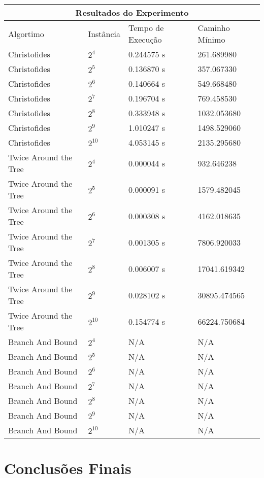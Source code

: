 \documentclass{article}
\begin{document}
\begin{tabular}{ |p{5cm}||p{2cm}|p{3cm}|p{3cm}|}
 \hline
 \multicolumn{4}{|c|}{Resultados do Experimento} \\
 \hline
 Algortimo & Instância & Tempo de Execução & Caminho Mínimo\\
 \hline
 Christofides & $2^4$ & 0.244575 s & 261.689980\\
 Christofides & $2^5$ & 0.136870 s & 357.067330 \\
 Christofides & $2^6$ & 0.140664 s & 549.668480\\
 Christofides & $2^7$ & 0.196704 s & 769.458530\\
 Christofides & $2^8$ & 0.333948 s & 1032.053680\\
 Christofides & $2^9$ & 1.010247 s & 1498.529060\\
 Christofides & $2^10$& 4.053145 s & 2135.295680\\
 Twice Around the Tree & $2^4$ & 0.000044 s & 932.646238\\
 Twice Around the Tree & $2^5$ & 0.000091 s & 1579.482045\\
 Twice Around the Tree & $2^6$ & 0.000308 s & 4162.018635\\
 Twice Around the Tree & $2^7$ & 0.001305 s & 7806.920033\\
 Twice Around the Tree & $2^8$ & 0.006007 s & 17041.619342\\
 Twice Around the Tree & $2^9$ & 0.028102 s & 30895.474565\\
 Twice Around the Tree & $2^10$& 0.154774 s & 66224.750684\\
 Branch And Bound & $2^4$ & N/A  & N/A\\
 Branch And Bound & $2^5$ & N/A & N/A\\
 Branch And Bound & $2^6$ & N/A & N/A\\
 Branch And Bound & $2^7$ & N/A & N/A\\
 Branch And Bound & $2^8$ &N/A & N/A\\
 Branch And Bound & $2^9$ & N/A & N/A\\
 Branch And Bound & $2^10$& N/A & N/A\\
 \hline
\end{tabular}

\section{Conclusões Finais}
\end{document}
